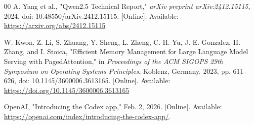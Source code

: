 \documentclass[conference]{IEEEtran}
\begin{document}
\begin{thebibliography}{00}
A. Yang et al.,
"Qwen2.5 Technical Report,"
\emph{arXiv preprint arXiv:2412.15115}, 2024, doi: 10.48550/arXiv.2412.15115. [Online]. Available: \url{https://arxiv.org/abs/2412.15115}

W. Kwon, Z. Li, S. Zhuang, Y. Sheng, L. Zheng, C. H. Yu, J. E. Gonzalez, H. Zhang, and I. Stoica,
"Efficient Memory Management for Large Language Model Serving with PagedAttention,"
in \emph{Proceedings of the ACM SIGOPS 29th Symposium on Operating Systems Principles}, Koblenz, Germany, 2023, pp. 611--626, doi: 10.1145/3600006.3613165. [Online]. Available: \url{https://doi.org/10.1145/3600006.3613165}

OpenAI,
"Introducing the Codex app," Feb. 2, 2026. [Online]. Available:
\url{https://openai.com/index/introducing-the-codex-app/}.

\end{thebibliography}
\end{document}
